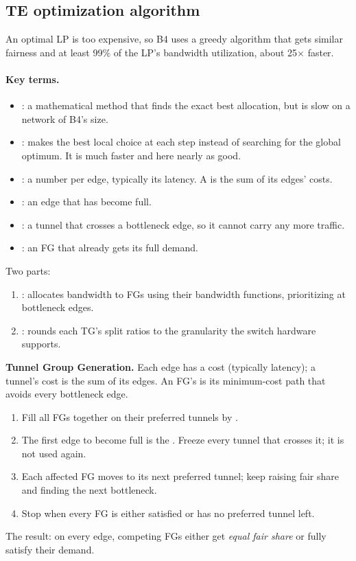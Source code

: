 \subsection{TE optimization algorithm}
An optimal LP is too expensive, so B4 uses a greedy algorithm that gets similar fairness and at least 99\% of the LP's bandwidth utilization, about 25$\times$ faster.

\paragraph{Key terms.}
\begin{itemize}
\item {}: a mathematical method that finds the exact best allocation, but is slow on a network of B4's size.
\item {}: makes the best local choice at each step instead of searching for the global optimum. It is much faster and here nearly as good.
\item {}: a number per edge, typically its latency. A  is the sum of its edges' costs.
\item {}: an edge that has become full.
\item {}: a tunnel that crosses a bottleneck edge, so it cannot carry any more traffic.
\item {}: an FG that already gets its full demand.
\end{itemize}

Two parts:
\begin{enumerate}
\item {}: allocates bandwidth to FGs using their bandwidth functions, prioritizing at bottleneck edges.
\item {}: rounds each TG's split ratios to the granularity the switch hardware supports.
\end{enumerate}

\textbf{Tunnel Group Generation.} Each edge has a cost (typically latency); a tunnel's cost is the sum of its edges. An FG's  is its minimum-cost path that avoids every bottleneck edge.
\begin{enumerate}
\item Fill all FGs together on their preferred tunnels by .
\item The first edge to become full is the . Freeze every tunnel that crosses it; it is not used again.
\item Each affected FG moves to its next preferred tunnel; keep raising fair share and finding the next bottleneck.
\item Stop when every FG is either satisfied or has no preferred tunnel left.
\end{enumerate}
The result: on every edge, competing FGs either get \emph{equal fair share} or fully satisfy their demand.

